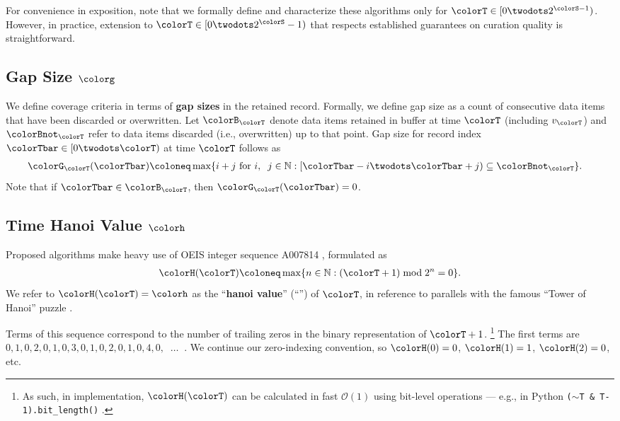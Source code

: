 For convenience in exposition, note that we formally define and characterize these algorithms only for $\colorT \in [0 \twodots 2^{\colorS - 1})$.
However, in practice, extension to $\colorT \in [0 \twodots 2^{\colorS} - 1)$ that respects established guarantees on curation quality is straightforward.

\subsection{Gap Size $\colorg$}
\label{sec:notation-gapsize}

We define coverage criteria in terms of \textbf{gap sizes} in the retained record.
Formally, we define gap size as a count of consecutive data items that have been discarded or overwritten.
Let $\colorB_{\colorT}$ denote data items retained in buffer at time $\colorT$ (including $v_{\colorT}$) and $\colorBnot_{\colorT}$ refer to data items discarded (i.e., overwritten) up to that point.
Gap size for record index $\colorTbar \in [0 \twodots \colorT)$ at time $\colorT$ follows as
\begin{align}
\colorG_{\colorT}(\colorTbar)
&\coloneq
\max
\{
  i + j
  \text{ for }
  i,\;\; j \in \mathbb{N}
  :
  [\colorTbar-i \twodots \colorTbar+j) \subseteq \colorBnot_{\colorT}
\}.
\label{eqn:gap-size-defn}
\end{align}
Note that if $\colorTbar \in \colorB_{\colorT}$, then $\colorG_{\colorT}(\colorTbar) = 0$.

\subsection{Time Hanoi Value $\colorh$}
\label{sec:notation-hanoi}

Proposed algorithms make heavy use of OEIS integer sequence A007814 \citep{oeis}, formulated as
\begin{align}
\colorH(\colorT)
\coloneq
\max \{ n \in \mathbb{N} : (\colorT + 1) \bmod 2^n = 0 \}.
\label{eqn:hanoi-defn}
\end{align}
We refer to $\colorH(\colorT) = \colorh$ as the ``\textbf{hanoi value}'' (``\textbf{\hv{}}'') of $\colorT$, in reference to parallels with the famous ``Tower of Hanoi'' puzzle \citep{lucas1889jeux}.

Terms of this sequence correspond to the number of trailing zeros in the binary representation of $\colorT + 1$.%
\footnote{%
As such, in implementation, $\colorH(\colorT)$ can be calculated in fast $\mathcal{O}(1)$ using bit-level operations --- e.g., in Python \texttt{($\sim$T \& T-1).bit\_length()} \citep{oeis}.
}
The first terms are $0,\allowbreak 1,\allowbreak 0,\allowbreak 2,\allowbreak 0,\allowbreak 1,\allowbreak 0,\allowbreak 3,\allowbreak 0,\allowbreak 1,\allowbreak 0,\allowbreak 2,\allowbreak 0,\allowbreak 1,\allowbreak 0,\allowbreak 4,\allowbreak 0,\allowbreak \;\;\ldots \;\;$.
We continue our zero-indexing convention, so $\colorH(0) = 0$, $\colorH(1) = 1$, $\colorH(2) = 0$, etc.

